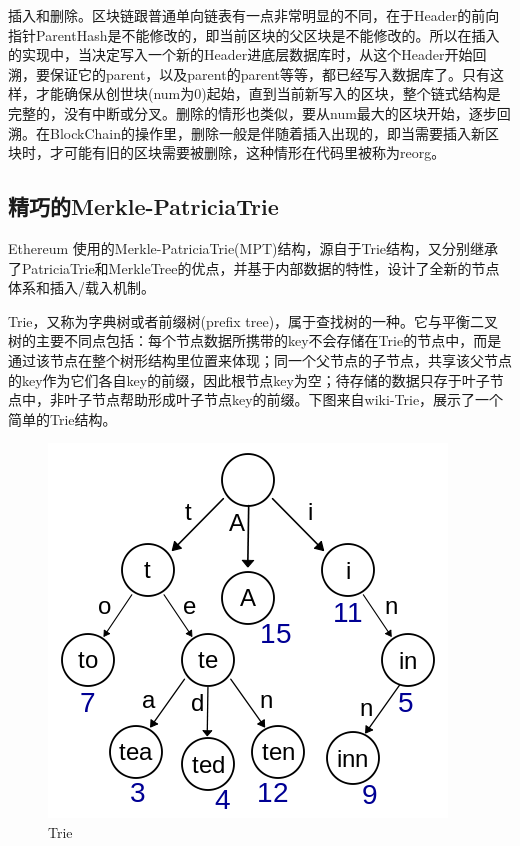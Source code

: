 \documentclass[UTF8]{ctexart}
\begin{document}
插入和删除。区块链跟普通单向链表有一点非常明显的不同，在于Header的前向指针ParentHash是不能修改的，即当前区块的父区块是不能修改的。所以在插入的实现中，当决定写入一个新的Header进底层数据库时，从这个Header开始回溯，要保证它的parent，以及parent的parent等等，都已经写入数据库了。只有这样，才能确保从创世块(num为0)起始，直到当前新写入的区块，整个链式结构是完整的，没有中断或分叉。删除的情形也类似，要从num最大的区块开始，逐步回溯。在BlockChain的操作里，删除一般是伴随着插入出现的，即当需要插入新区块时，才可能有旧的区块需要被删除，这种情形在代码里被称为reorg。

\subsection{精巧的Merkle-PatriciaTrie}

Ethereum 使用的Merkle-PatriciaTrie(MPT)结构，源自于Trie结构，又分别继承了PatriciaTrie和MerkleTree的优点，并基于内部数据的特性，设计了全新的节点体系和插入/载入机制。

Trie，又称为字典树或者前缀树(prefix tree)，属于查找树的一种。它与平衡二叉树的主要不同点包括：每个节点数据所携带的key不会存储在Trie的节点中，而是通过该节点在整个树形结构里位置来体现；同一个父节点的子节点，共享该父节点的key作为它们各自key的前缀，因此根节点key为空；待存储的数据只存于叶子节点中，非叶子节点帮助形成叶子节点key的前缀。下图来自wiki-Trie，展示了一个简单的Trie结构。

\begin{figure}
	\centering
	\includegraphics[scale=0.5]{trie.png}
	\caption{Trie}
	\label{trie}
\end{figure}
\end{document}
